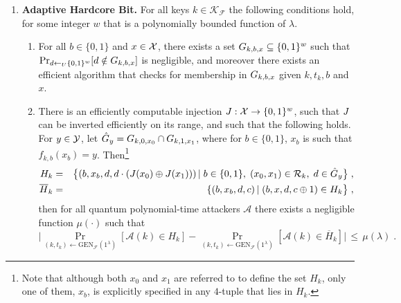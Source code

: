 \begin{definition}
\begin{enumerate}
\begin{enumerate}
\end{enumerate}


\item{\textbf{Adaptive Hardcore Bit.}}
For all keys $k\in \mathcal{K}_{\mathcal{F}}$ the following conditions hold, for some integer $w$ that is a polynomially bounded function of $\lambda$. 
\begin{enumerate}
\item For all $b\in \{0,1\}$ and $x\in \mathcal{X}$, there exists a set $G_{k,b,x}\subseteq \{0,1\}^{w}$ such that $\Pr_{d\leftarrow_U \{0,1\}^w}[d\notin G_{k,b,x}]$ is negligible, and moreover there exists an efficient algorithm that checks for membership in $G_{k,b,x}$ given $k,t_k,b$ and $x$. 
\item There is an efficiently computable injection $J:\mathcal{X}\to \{0,1\}^w$, such that $J$ can be inverted efficiently on its range, and such that the following holds. For $y\in \mathcal{Y}$, let $\hat{G}_y = G_{k,0,x_0}\cap G_{k,1,x_1}$, where for $b\in\{0,1\}$, $x_b$ is such that $f_{k,b}(x_b)=y$. Then\footnote{Note that although both $x_0$ and $x_1$ are referred to to define the set $H_k$, only one of them, $x_b$, is explicitly specified in any $4$-tuple that lies in $H_k$.}
\begin{eqnarray*}\label{eq:defsetsH}
H_k &=& \big\{(b,x_b,d,d\cdot(J(x_0)\oplus J(x_1)))\,|\; b\in \{0,1\},\; (x_0,x_1)\in \mathcal{R}_k,\; d\in \hat{G}_y\big\}\;,\\
\overline{H}_k &=& \{(b,x_b,d,c)\,|\; (b,x,d,c\oplus 1) \in H_k\big\}\;,
\end{eqnarray*}
then for all quantum polynomial-time attackers $\mathcal{A}$ there exists a negligible function $\mu(\cdot)$ such that 
\begin{equation}\label{eq:adaptive-hardcore}
\Big|\Pr_{(k,t_k)\leftarrow \textrm{GEN}_{\mathcal{F}}(1^{\lambda})}[\mathcal{A}(k) \in H_k] - \Pr_{(k,t_k)\leftarrow \textrm{GEN}_{\mathcal{F}}(1^{\lambda})}[\mathcal{A}(k) \in\overline{H}_k]\Big| \,\leq\, \mu(\lambda)\;.
\end{equation}
\end{enumerate}




\end{enumerate}
\end{definition}